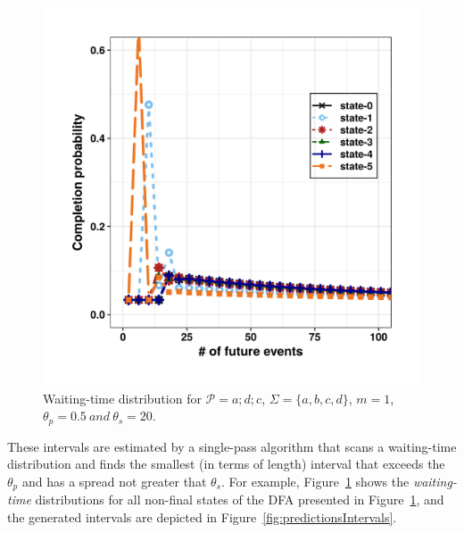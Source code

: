 \begin{figure}[H]
	\begin{centering}
		\center
		\includegraphics[width=\textwidth,keepaspectratio]{chapters/figures/new_wt.png}
		
		
		\caption{Waiting-time distribution for
			$\mathcal{P}=a ; d ; c$, $\Sigma=\{a,b,c,d\}$, $m=1$, $\theta_{p}=0.5\ and\ \theta_{s}=20$.}
		\label{fig:wt1}
	\end{centering}
\end{figure}

\par These intervals are estimated by a single-pass algorithm that scans a waiting-time distribution and finds the smallest (in terms of length) interval that exceeds the $\theta_{p}$ and has a spread  not greater that $\theta_{s}$. For example, Figure~\ref{fig:wt1} shows the \textit{waiting-time} distributions for all non-final states of the DFA presented in Figure~\ref{fig:wt1}, and the generated intervals are depicted in Figure~\ref{fig:predictionsIntervals}.


